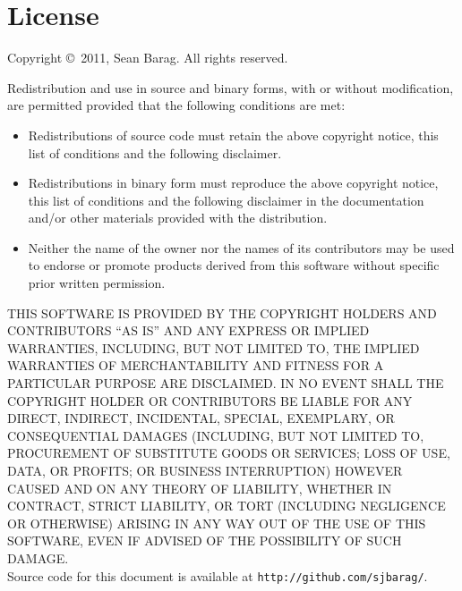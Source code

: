 \section{License}

Copyright \copyright\ 2011, Sean Barag.  All rights reserved.

Redistribution and use in source and binary forms, with or without
modification, are permitted provided that the following conditions are met:
\begin{itemize}
\item Redistributions of source code must retain the above copyright notice, this
  list of conditions and the following disclaimer.
\item Redistributions in binary form must reproduce the above copyright notice, this
  list of conditions and the following disclaimer in the documentation and/or
  other materials provided with the distribution.
\item Neither the name of the owner nor the names of its contributors may be
  used to endorse or promote products derived from this software without specific
  prior written permission.
\end{itemize}

THIS SOFTWARE IS PROVIDED BY THE COPYRIGHT HOLDERS AND CONTRIBUTORS ``AS IS'' AND
ANY EXPRESS OR IMPLIED WARRANTIES, INCLUDING, BUT NOT LIMITED TO, THE IMPLIED
WARRANTIES OF MERCHANTABILITY AND FITNESS FOR A PARTICULAR PURPOSE ARE
DISCLAIMED. IN NO EVENT SHALL THE COPYRIGHT HOLDER OR CONTRIBUTORS BE LIABLE
FOR ANY DIRECT, INDIRECT, INCIDENTAL, SPECIAL, EXEMPLARY, OR CONSEQUENTIAL
DAMAGES (INCLUDING, BUT NOT LIMITED TO, PROCUREMENT OF SUBSTITUTE GOODS OR
SERVICES; LOSS OF USE, DATA, OR PROFITS; OR BUSINESS INTERRUPTION) HOWEVER
CAUSED AND ON ANY THEORY OF LIABILITY, WHETHER IN CONTRACT, STRICT LIABILITY,
OR TORT (INCLUDING NEGLIGENCE OR OTHERWISE) ARISING IN ANY WAY OUT OF THE USE
OF THIS SOFTWARE, EVEN IF ADVISED OF THE POSSIBILITY OF SUCH DAMAGE.\\

Source code for this document is available at \texttt{http://github.com/sjbarag/}.
